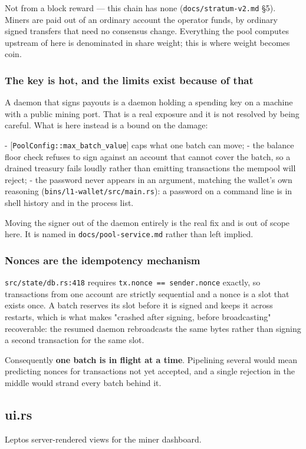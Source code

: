 \documentclass[11pt,a4paper]{article}
\begin{document}
Not from a block reward — this chain has none (\texttt{docs/stratum-v2.md} §5).
Miners are paid out of an ordinary account the operator funds, by ordinary
signed transfers that need no consensus change. Everything the pool computes
upstream of here is denominated in share weight; this is where weight
becomes coin.

\subsubsection{The key is hot, and the limits exist because of that}

A daemon that signs payouts is a daemon holding a spending key on a machine
with a public mining port. That is a real exposure and it is not resolved by
being careful. What is here instead is a bound on the damage:

- [\texttt{PoolConfig::max\_batch\_value}] caps what one batch can move;
- the balance floor check refuses to sign against an account that cannot
  cover the batch, so a drained treasury fails loudly rather than emitting
  transactions the mempool will reject;
- the password never appears in an argument, matching the wallet's own
  reasoning (\texttt{bins/l1-wallet/src/main.rs}): a password on a command line is in shell
  history and in the process list.

Moving the signer out of the daemon entirely is the real fix and is out of
scope here. It is named in \texttt{docs/pool-service.md} rather than left implied.

\subsubsection{Nonces are the idempotency mechanism}

\texttt{src/state/db.rs:418} requires \texttt{tx.nonce == sender.nonce} exactly, so
transactions from one account are strictly sequential and a nonce is a slot
that exists once. A batch reserves its slot before it is signed and keeps
it across restarts, which is what makes "crashed after signing, before
broadcasting" recoverable: the resumed daemon rebroadcasts the same bytes
rather than signing a second transaction for the same slot.

Consequently \textbf{one batch is in flight at a time}. Pipelining several would
mean predicting nonces for transactions not yet accepted, and a single
rejection in the middle would strand every batch behind it.

\subsection{ui.rs}
Leptos server-rendered views for the miner dashboard.
\end{document}
